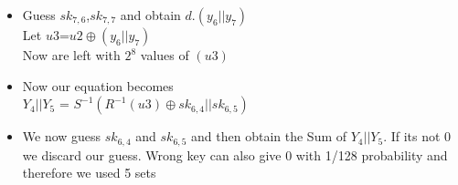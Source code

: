 \begin{frame}
	\begin{itemize}
	
		\item Guess $sk_{7,6}$,$sk_{7,7}$ and obtain 
		$d.(y_{6}||y_{7})$\\
		Let $u3$=$u2 \oplus (y_{6}||y_{7})$  \\  
		Now are left with $2^8$ values of $(u3)$ \\
		\item Now our equation becomes \\
		$Y_{4}||Y_{5}$ = $S^{-1}(R^{-1}(u3)
		\oplus sk_{6,4} || sk_{6,5})$\\
		\item We now guess $sk_{6,4}$ and $sk_{6,5}$ and then obtain the Sum of $Y_{4}||Y_{5}$. If its not 0 we discard our guess. Wrong key can also give 0  with 1/128 probability and therefore we used 5 sets
	\end{itemize}
\end{frame}
